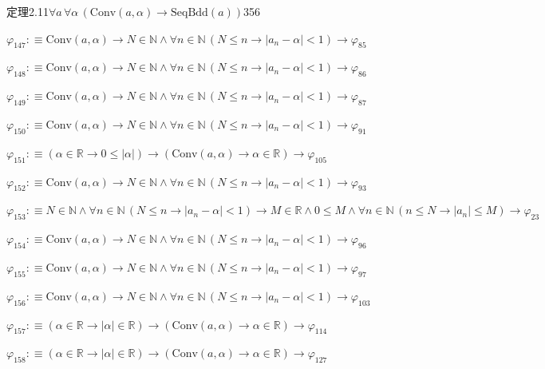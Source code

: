 \begin{fullproof}{定理2.11}{$\forall a\,\forall \alpha\,(\mathrm{Conv}(a,\alpha) \to \mathrm{SeqBdd}(a))$}{356}
\begin{abbrevlist}
\item $\varphi_{147} :\equiv \mathrm{Conv}(a,\alpha) \to N \in \mathbb{N} \land \forall n \in \mathbb{N}\,(N \leq n \to \lvert a_{n} - \alpha \rvert < 1) \to \varphi_{85}$
\item $\varphi_{148} :\equiv \mathrm{Conv}(a,\alpha) \to N \in \mathbb{N} \land \forall n \in \mathbb{N}\,(N \leq n \to \lvert a_{n} - \alpha \rvert < 1) \to \varphi_{86}$
\item $\varphi_{149} :\equiv \mathrm{Conv}(a,\alpha) \to N \in \mathbb{N} \land \forall n \in \mathbb{N}\,(N \leq n \to \lvert a_{n} - \alpha \rvert < 1) \to \varphi_{87}$
\item $\varphi_{150} :\equiv \mathrm{Conv}(a,\alpha) \to N \in \mathbb{N} \land \forall n \in \mathbb{N}\,(N \leq n \to \lvert a_{n} - \alpha \rvert < 1) \to \varphi_{91}$
\item $\varphi_{151} :\equiv (\alpha \in \mathbb{R} \to 0 \leq \lvert \alpha \rvert) \to (\mathrm{Conv}(a,\alpha) \to \alpha \in \mathbb{R}) \to \varphi_{105}$
\item $\varphi_{152} :\equiv \mathrm{Conv}(a,\alpha) \to N \in \mathbb{N} \land \forall n \in \mathbb{N}\,(N \leq n \to \lvert a_{n} - \alpha \rvert < 1) \to \varphi_{93}$
\item $\varphi_{153} :\equiv N \in \mathbb{N} \land \forall n \in \mathbb{N}\,(N \leq n \to \lvert a_{n} - \alpha \rvert < 1) \to M \in \mathbb{R} \land 0 \leq M \land \forall n \in \mathbb{N}\,(n \leq N \to \lvert a_{n} \rvert \leq M) \to \varphi_{23}$
\item $\varphi_{154} :\equiv \mathrm{Conv}(a,\alpha) \to N \in \mathbb{N} \land \forall n \in \mathbb{N}\,(N \leq n \to \lvert a_{n} - \alpha \rvert < 1) \to \varphi_{96}$
\item $\varphi_{155} :\equiv \mathrm{Conv}(a,\alpha) \to N \in \mathbb{N} \land \forall n \in \mathbb{N}\,(N \leq n \to \lvert a_{n} - \alpha \rvert < 1) \to \varphi_{97}$
\item $\varphi_{156} :\equiv \mathrm{Conv}(a,\alpha) \to N \in \mathbb{N} \land \forall n \in \mathbb{N}\,(N \leq n \to \lvert a_{n} - \alpha \rvert < 1) \to \varphi_{103}$
\item $\varphi_{157} :\equiv (\alpha \in \mathbb{R} \to \lvert \alpha \rvert \in \mathbb{R}) \to (\mathrm{Conv}(a,\alpha) \to \alpha \in \mathbb{R}) \to \varphi_{114}$
\item $\varphi_{158} :\equiv (\alpha \in \mathbb{R} \to \lvert \alpha \rvert \in \mathbb{R}) \to (\mathrm{Conv}(a,\alpha) \to \alpha \in \mathbb{R}) \to \varphi_{127}$

\end{abbrevlist}
\end{fullproof}
